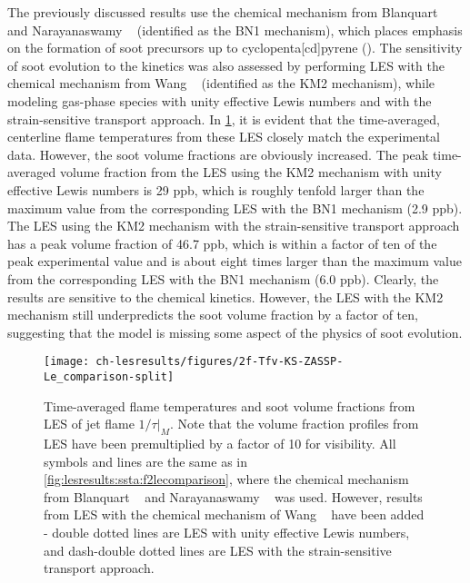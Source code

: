 The previously discussed results use the chemical mechanism from Blanquart \etal~\cite{blanquart2009} and Narayanaswamy \etal~\cite{narayanaswamy2010} (identified as the BN1 mechanism), which places emphasis on the formation of soot precursors up to cyclopenta[cd]pyrene (). The sensitivity of soot evolution to the kinetics was also assessed by performing LES with the chemical mechanism from Wang \etal~\cite{wang2013} (identified as the KM2 mechanism), while modeling gas-phase species with unity effective Lewis numbers and with the strain-sensitive transport approach. In \cref{fig:lesresults:ssta:f2lemechcomparison}, it is evident that the time-averaged, centerline flame temperatures from these LES closely match the experimental data. However, the soot volume fractions are obviously increased. The peak time-averaged volume fraction from the LES using the KM2 mechanism with unity effective Lewis numbers is 29 ppb, which is roughly tenfold larger than the maximum value from the corresponding LES with the BN1 mechanism (2.9 ppb). The LES using the KM2 mechanism with the strain-sensitive transport approach has a peak volume fraction of 46.7 ppb, which is within a factor of ten of the peak experimental value and is about eight times larger than the maximum value from the corresponding LES with the BN1 mechanism (6.0 ppb). Clearly, the results are sensitive to the chemical kinetics. However, the LES with the KM2 mechanism still underpredicts the soot volume fraction by a factor of ten, suggesting that the model is missing some aspect of the physics of soot evolution. %

\begin{figure}[htb]
  \centering
  \texttt{[image: ch-lesresults/figures/2f-Tfv-KS-ZASSP-Le\_comparison-split]}
  \caption[Centerline \texorpdfstring{$\langle T \rangle$}{<T>} \& \texorpdfstring{$\langle f_V \rangle$}{<fV>} from LES of Flame \texorpdfstring{$1/\tau|_M$}{1/t|M} with Various Transport Approaches and Chemical Mechanisms]{Time-averaged flame temperatures and soot volume fractions from LES of jet flame $1/\tau|_M$. Note that the volume fraction profiles from LES have been premultiplied by a factor of 10 for visibility. All symbols and lines are the same as in \cref{fig:lesresults:ssta:f2lecomparison}, where the chemical mechanism from Blanquart \etal~\cite{blanquart2009} and Narayanaswamy \etal~\cite{narayanaswamy2010} was used. However, results from LES with the chemical mechanism of Wang \etal~\cite{wang2013} have been added - double dotted lines are LES with unity effective Lewis numbers, and dash-double dotted lines are LES with the strain-sensitive transport approach.}
  \label{fig:lesresults:ssta:f2lemechcomparison}
\end{figure}

